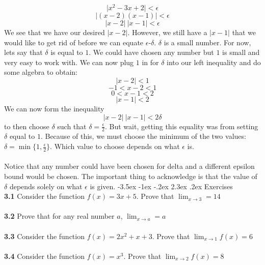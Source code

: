 \documentclass[11pt]{scrartcl}
\makeatletter
\renewcommand\section{\@startsection{section}{1}{\z@}%
                                   {-3.5ex \@plus -1ex \@minus -.2ex}%
                                   {2.3ex \@plus.2ex}%
                                   {\normalfont\large\bfseries}}
\makeatother
\begin{document}
$$\lvert x^2-3x+2 \rvert<\epsilon$$
$$\lvert (x-2)(x-1) \rvert<\epsilon$$
$$\lvert x-2 \rvert \: \lvert x-1 \rvert<\epsilon$$
We see that we have our desired $\lvert x-2 \rvert$. However, we still have a $\lvert x-1 \rvert$ that we would like to get rid of before we can equate $\epsilon$-$\delta$. $\delta$ is a small number. For now, lets say that $\delta$ is equal to $1$. We could have chosen any number but $1$ is small and very easy to work with. We can now plug $1$ in for $\delta$ into our left inequality and do some algebra to obtain:
$$\lvert x-2 \rvert<1$$
$$-1<x-2<1$$
$$0<x-1<2$$
$$\lvert x-1 \rvert<2$$
We can now form the inequality
$$\lvert x-2 \rvert \: \lvert x-1 \rvert<2\delta$$
to then choose $\delta$ such that $\delta=\frac{\epsilon}{2}$. But wait, getting this equality was from setting $\delta$ equal to $1$. Because of this, we must choose the minimum of the two values:
$\delta=\min\{1,\frac{\epsilon}{2}\}$. Which value to choose depends on what $\epsilon$ is.\\
\noindent\\
Notice that any number could have been chosen for delta and a different epsilon bound would be chosen. The important thing to acknowledge is that the value of $\delta$ depends solely on what $\epsilon$ is given. 
\newpage
\section{Exercises}\\
\noindent
\textbf{3.1} Consider the function $f(x)=3x+5$. Prove that $\lim_{x \to 3}=14$\\
\noindent\\ 
\textbf{3.2} Prove that for any real number $a$, $\lim_{x \to a}=a$\\
\noindent\\
\textbf{3.3} Consider the function $f(x)=2x^2+x+3$. Prove that $\lim_{x \to 1} f(x)=6$\\
\noindent\\
\textbf{3.4} Consider the function $f(x)=x^3$. Prove that $\lim_{x \to 2} f(x)=8$\\
\end{document}

